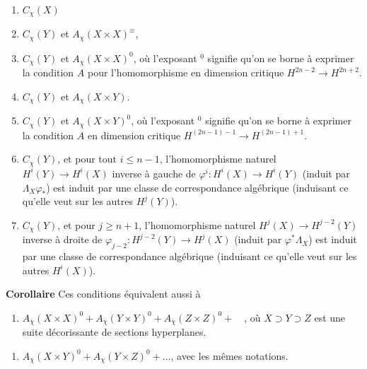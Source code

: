 \documentclass[11pt,a4paper]{article}
\begin{document}
\begin{enumerate}
\item[(i)] $C_{\chi}(X)$
\item[(ii)] $C_{\chi}(Y)$ et $A_{\chi}(X \times X)^{\equiv}$, \struck{\ill{}}
\item[(ii bis)] $C_{\chi}(Y)$ et $A_{\chi}(X \times X)^{0}$, où l'exposant
$^{0}$ signifie qu'on se borne à exprimer la condition $A$ pour
l'homomorphisme en dimension critique $H^{2n-2} \longrightarrow H^{2n+2}$.
\item[(iii)] $C_{\chi}(Y)$ et $A_{\chi}(X \times Y)$.
\item[(iii bis)] $C_{\chi}(Y)$ et $A_{\chi}(X \times Y)^{0}$, où l'exposant
$^{0}$ signifie qu'on se borne à exprimer la condition $A$ en dimension critique
$H^{(2n-1)-1} \longrightarrow H^{(2n-1)+1}$.
\item[(iv)] \struck{\ill{}} $C_{\chi}(Y)$, et pour tout $i \leq n-1$,
l'homomorphisme naturel $H^{i}(Y) \to H^{i}(X)$ inverse à gauche de
$\varphi^{i} : H^{i}(X) \to H^{i}(Y)$ (induit par $\Lambda_{X}\varphi_{*}$) est
induit par une classe de correspondance algébrique (induisant ce qu'elle veut
sur les autres $H^{j}(Y)$).
\item[(iv bis)] $C_{\chi}(Y)$, et pour $j \geq n+1$, l'homomorphisme naturel
$H^{j}(X) \to H^{j-2}(Y)$ inverse à droite de $\varphi_{j-2} : H^{j-2}(Y) \to
H^{j}(X)$  (induit par $\varphi^{*}\Lambda_{X}$) est induit par une
classe de correspondance algébrique (induisant ce qu'elle veut sur les autres
$H^{i}(X)$).
\end{enumerate}

\textbf{Corollaire} Ces conditions équivalent aussi à

\begin{enumerate}
\item[(v)] $A_{\chi}(X \times X)^{0} + A_{\chi}(Y \times Y)^{0} +
A_{\chi}(Z \times Z)^{0} + \quad$, où $X \supset Y \supset Z$ est une suite
décorissante de sections hyperplanes. \ill{}
\end{enumerate}


\begin{enumerate}
\item[(vi)] $A_{\chi}(X \times Y)^{0} + A_{\chi}(Y \times Z)^{0} + \dots$,
avec les mêmes notations.
\end{enumerate}
\end{document}

